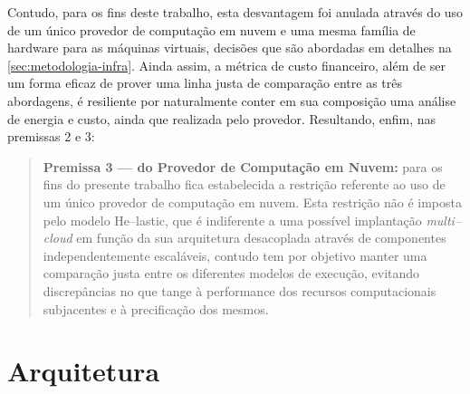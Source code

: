 \documentclass[english,brazilian]{UNISINOSmonografia} %
\begin{document}
Contudo, para os fins deste trabalho, esta desvantagem foi anulada através do uso de um único provedor de computação em nuvem e uma mesma família de hardware para as máquinas virtuais, decisões que são abordadas em detalhes na \autoref{sec:metodologia-infra}.
Ainda assim, a métrica de custo financeiro, além de ser um forma eficaz de prover uma linha justa de comparação entre as três abordagens, é resiliente por naturalmente conter em sua composição uma análise de energia e custo, ainda que realizada pelo provedor.
Resultando, enfim, nas premissas 2 e 3:
\begin{quote}
	\textbf{Premissa 3 --- do Provedor de Computação em Nuvem:} para os fins do presente trabalho fica estabelecida a restrição referente ao uso de um único provedor de computação em nuvem. Esta restrição não é imposta pelo modelo \textsf{He}--lastic, que é indiferente a uma possível implantação \textit{multi--cloud} em função da sua arquitetura desacoplada através de componentes independentemente escaláveis, contudo tem por objetivo manter uma comparação justa entre os diferentes modelos de execução, evitando discrepâncias no que tange à performance dos recursos computacionais subjacentes e à precificação dos mesmos.
\end{quote}



\section{Arquitetura}
\label{sec:modelo-arquitetura}
\end{document}
